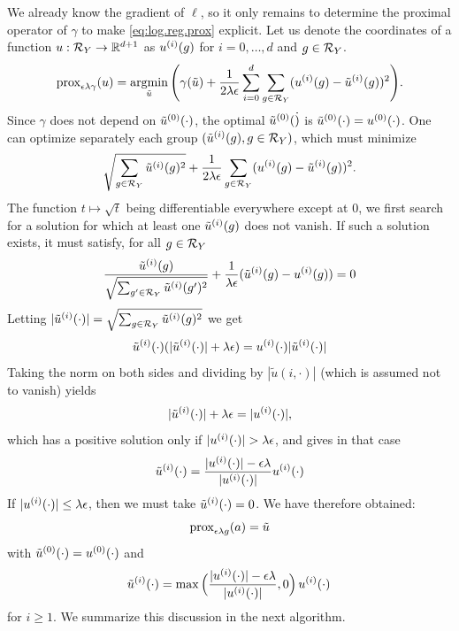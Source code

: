 We already know the gradient of $\ell$, so it only remains to determine the proximal operator of $\gamma$ to make \cref{eq:log.reg.prox} explicit. Let us denote the coordinates of a function $u: {\mathcal R}_Y\to {\mathbb{R}}^{d+1}$ as $u^{(i)} (g)$ for $i = 0, \ldots, d$ and $g\in {\mathcal R}_Y$.
\[
\operatorname{prox}_{\epsilon\lambda \gamma} (u) = \operatorname*{argmin}_{\tilde u} \Bigg(\gamma(\tilde u) + 
\frac{1}{2\lambda \epsilon} \sum_{i=0}^d \sum_{g\in{\mathcal R}_Y} (u^{(i)} ( g) - \tilde u^{(i)}(g))^2\Bigg).
\]
 Since $\gamma$ does not depend on $\tilde u^{(0)} (\cdot)$, the optimal $\tilde u^{(0)}(\dot)$ is $\tilde u^{(0)}(\cdot) = u^{(0)}(\cdot)$.
 One can optimize separately each group $(\tilde u^{(i)}(g), g \in {\mathcal R}_Y)$, which must  minimize
\[
\sqrt{\sum_{g\in {\mathcal R}_Y} \tilde u^{(i)}(g)^2} + \frac{1}{2\lambda \epsilon} \sum_{g\in{\mathcal R}_Y} (u^{(i)}(g) - \tilde u^{(i)}(g))^2.
\]
The function $t \mapsto \sqrt t$ being differentiable everywhere except at $0$, we first search for a solution for which at least one $\tilde u^{(i)}( g)$ does not vanish.
 If such a solution exists, it must satisfy, for all $g\in{\mathcal R}_Y$
\[
\frac{\tilde u^{(i)}(g)}{\sqrt{\sum_{g'\in {\mathcal R}_Y} \tilde u^{(i)}(g')^2}} + \frac{1}{\lambda \epsilon} (\tilde u^{(i)}( g) - u^{(i)}(g)) = 0
\]
Letting $|\tilde u^{(i)}(\cdot)| = \sqrt{\sum_{g\in {\mathcal R}_Y} \tilde u^{(i)}(g)^2}$ we get 
\[
\tilde u^{(i)}( \cdot) (|\tilde u^{(i)}( \cdot)| + \lambda \epsilon) = u^{(i)}(\cdot) |\tilde u^{(i)}(\cdot)|
\]
Taking the norm on both sides and dividing by $|\tilde u(i, \cdot)|$ (which is assumed not to vanish) yields
\[
|\tilde u^{(i)}(\cdot)| + \lambda \epsilon = | u^{(i)}(\cdot)|,
\]
which has a positive solution only if
$| u^{(i)}(\cdot)| > \lambda\epsilon$, and gives in that case 
\[
\tilde u^{(i)}(\cdot) = \frac{|u^{(i)}(\cdot)| - \epsilon\lambda}{|u^{(i)}(\cdot)|} u^{(i)}(\cdot)
\]
If $| u^{(i)}(\cdot)| \leq \lambda\epsilon$, then we must take $\tilde u^{(i)} (\cdot) = 0$.
We have therefore obtained:
\[
\operatorname{prox}_{\epsilon\lambda g} (a) = \tilde u
\]
with $\tilde u^{(0)}( \cdot) = u^{(0)}(\cdot) $ and  
\[
\tilde u^{(i)}(\cdot) = \max\Big(\frac{|u^{(i)}(\cdot)| - \epsilon\lambda}{|u^{(i)}(\cdot)|}, 0\Big)\,  u^{(i)}(\cdot)\,
\]
for $i\geq 1$.  We summarize this discussion in the next algorithm.

